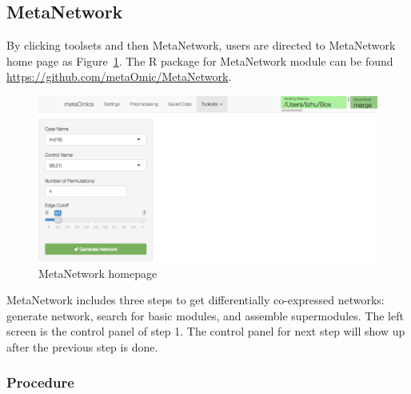 \subsection{MetaNetwork}
By clicking toolsets and then MetaNetwork,
users are directed to MetaNetwork home page as Figure~\ref{fig:MetaNetworkHome}.
The R package for MetaNetwork module can be found \url{https://github.com/metaOmic/MetaNetwork}.

\begin{figure}[H]
\begin{center}
\includegraphics[scale=0.8]{./figure/MetaNetwork/MetaNetworkHome}
\caption{MetaNetwork homepage}
\label{fig:MetaNetworkHome}
\end{center}
\end{figure}

MetaNetwork includes three steps to get differentially co-expressed networks: generate network, search for basic modules, and assemble supermodules. The left screen is the control panel of step 1. The control panel for next step will show up after the previous step is done.

\subsubsection{Procedure}

